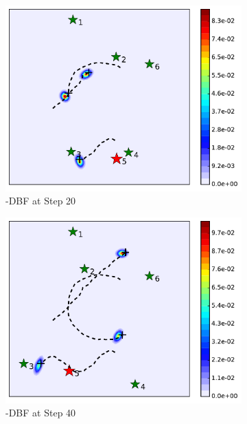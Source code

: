 \begin{figure}
\begin{subfigure}[b]{0.23\textwidth}
			\includegraphics[width=\textwidth]{figures/dbf_hetero_mov_sen_mov_tar_rbt5_step20}
			\caption{\proto-DBF at Step 20}\label{fig:step20}
		\end{subfigure}	
		\begin{subfigure}[b]{0.23\textwidth}
			\includegraphics[width=\textwidth]{figures/dbf_hetero_mov_sen_mov_tar_rbt5_step40}
			\caption{\proto-DBF at Step 40}\label{fig:step40}
		\end{subfigure}	
		\begin{subfigure}[b]{0.23\textwidth}

\end{subfigure}
\end{figure}
